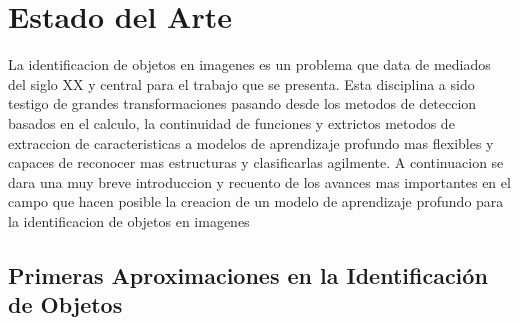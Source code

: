 \chapter{Estado del Arte}%

La identificacion de objetos en imagenes es un problema que data de mediados del siglo XX y central para el trabajo que se presenta. Esta disciplina a sido testigo de grandes transformaciones pasando desde los metodos de deteccion basados en el calculo, la continuidad de funciones y extrictos metodos de extraccion de caracteristicas a modelos de aprendizaje profundo mas flexibles y capaces de reconocer mas estructuras y clasificarlas agilmente. A continuacion se dara una muy breve introduccion y recuento de los avances mas importantes en el campo que hacen posible la creacion de un modelo de aprendizaje profundo para la identificacion de objetos en imagenes






\section{Primeras Aproximaciones en la Identificación de Objetos}

